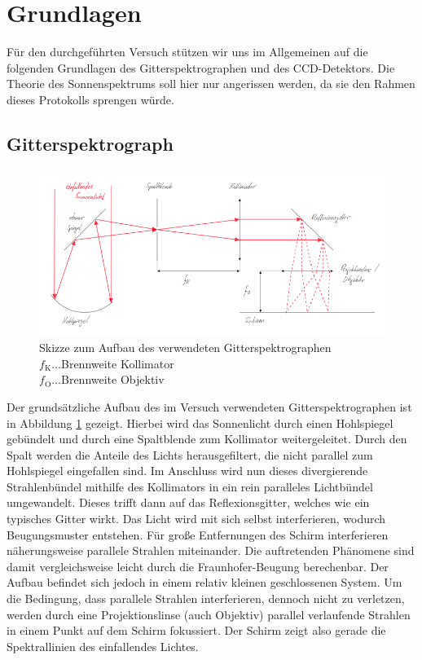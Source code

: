 \section{Grundlagen} %
\label{sec:grundlagen}

	Für den durchgeführten Versuch stützen wir uns im Allgemeinen auf die folgenden Grundlagen des Gitterspektrographen und des CCD-Detektors.
	Die Theorie des Sonnenspektrums soll hier nur angerissen werden, da sie den Rahmen dieses Protokolls sprengen würde. 

	\subsection{Gitterspektrograph} %
	\label{sub:gitterspektrograph}

		\begin{figure}
			\center
			\includegraphics[scale=0.55]{skizzen/skizze-1.png}
			\caption{Skizze zum Aufbau des verwendeten Gitterspektrographen \\ $f_\mathrm{K}\ldots$Brennweite Kollimator \\ $f_\mathrm{O}\ldots$Brennweite Objektiv}
			\label{fig:skizze-spektrograph}
		\end{figure}

		Der grundsätzliche Aufbau des im Versuch verwendeten Gitterspektrographen ist in Abbildung \ref{fig:skizze-spektrograph} gezeigt.
		Hierbei wird das Sonnenlicht durch einen Hohlspiegel gebündelt und  durch eine Spaltblende zum Kollimator weitergeleitet.
		Durch den Spalt werden die Anteile des Lichts herausgefiltert, die nicht parallel zum Hohlspiegel eingefallen sind.
		Im Anschluss wird nun dieses divergierende Strahlenbündel mithilfe des Kollimators in ein rein paralleles Lichtbündel umgewandelt.
		Dieses trifft dann auf das Reflexionsgitter, welches wie ein typisches Gitter wirkt.
		Das Licht wird mit sich selbst interferieren, wodurch Beugungsmuster entstehen.
		Für große Entfernungen des Schirm interferieren näherungsweise parallele Strahlen miteinander.
		Die auftretenden Phänomene sind damit vergleichsweise leicht durch die Fraunhofer-Beugung berechenbar.
		Der Aufbau befindet sich jedoch in einem relativ kleinen geschlossenen System.
		Um die Bedingung, dass parallele Strahlen interferieren, dennoch nicht zu verletzen, werden durch eine Projektionslinse (auch Objektiv) parallel verlaufende Strahlen in einem Punkt auf dem Schirm fokussiert.
		Der Schirm zeigt also gerade die Spektrallinien des einfallendes Lichtes.

